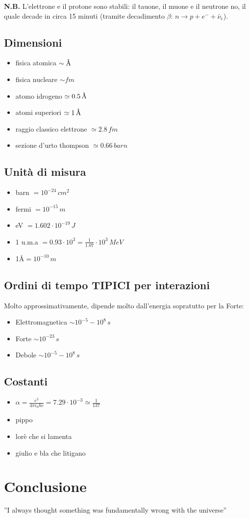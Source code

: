 \documentclass[twoside]{article}
\newcommand{\angstrom}{\textup{\AA}}
\begin{document}
\textbf{N.B.} L'elettrone e il protone sono stabili: il tauone, il muone e il neutrone no, il quale decade in circa 15 minuti (tramite decadimento $\beta$: $n \rightarrow p + e^- + \bar{\nu}_e$).
\subsection{Dimensioni}
\begin{itemize}
    \item fisica atomica $\sim \angstrom$
    \item fisica nucleare $ \sim fm$
    \item atomo idrogeno $\simeq 0.5\, \angstrom$ 
    \item atomi superiori  $\simeq 1\, \angstrom$
    \item raggio classico elettrone $\simeq 2.8\,fm $
    \item sezione d'urto thompson $\simeq 0.66\, barn$
\end{itemize}

\subsection{Unità di misura}
\begin{itemize}
    \item barn $= 10^{-24}\, cm^2$
    \item fermi $= 10^{-15}\, m$
    \item eV $= 1.602\cdot10^{-19}\, J $
    \item 1 u.m.a $=0.93\cdot10^{3}=\frac{1}{1.07}\cdot10^3\, MeV$
    \item 1\angstrom $=10^{-10}\, m$
\end{itemize}

\subsection{Ordini di tempo \textbf{TIPICI} per interazioni}
Molto approssimativamente, dipende molto dall'energia sopratutto per la Forte:
\begin{itemize}
    \item Elettromagnetica $\sim10^{-5}-10^{8}\, s$
    \item Forte $\sim 10^{-23}\, s$
    \item Debole $\sim 10^{-5}-10^{8}\, s$
\end{itemize} 
\subsection{Costanti}
\begin{itemize}
    \item$\alpha=\frac{e^2}{4\pi \epsilon_0 \hbar c}=7.29 \cdot 10^{-3} \simeq \frac{1}{137}$
    \item pippo
    \item lorè che si lamenta
    \item giulio e bla che litigano
\end{itemize}

\newpage

\section{Conclusione}
''I always thought something was fundamentally wrong with the universe'' \citep{adams1995hitchhiker}
\vfill


\end{document}
